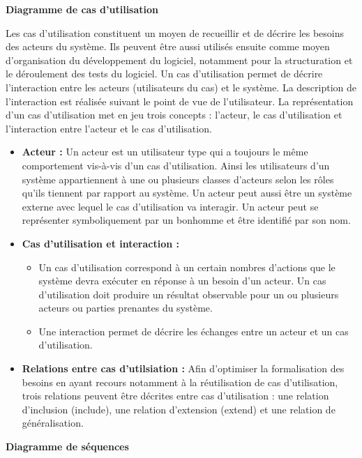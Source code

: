  \textbf{Diagramme de cas d'utilisation}

Les cas d’utilisation constituent un moyen de recueillir et de décrire les besoins des acteurs du système. Ils peuvent être aussi utilisés ensuite comme moyen d’organisation du développement du logiciel, notamment pour la structuration et le déroulement des tests du logiciel. Un cas d’utilisation permet de décrire l’interaction entre les acteurs (utilisateurs du cas) et le système. La description de l’interaction est réalisée suivant le point de vue de l’utilisateur. La représentation d’un cas d’utilisation met en jeu trois concepts : l’acteur, le cas d’utilisation et l’interaction entre l’acteur et le cas d’utilisation.

\begin{itemize}[label=\textbullet, font=\LARGE \color{blue}] 
	\item   \textbf{Acteur :} 
	Un acteur est un utilisateur type qui a toujours le même comportement vis-à-vis d’un cas d’utilisation. Ainsi les utilisateurs d’un système appartiennent à une ou plusieurs classes d’acteurs selon les rôles qu’ils tiennent par rapport au système. Un acteur peut aussi être un système externe avec lequel le cas d’utilisation va interagir. Un acteur peut se représenter symboliquement par un bonhomme et être identifié par son nom. 
	
	\item  \textbf{Cas d'utilisation et interaction :}
		\begin{itemize}[label=\textbullet, font=\LARGE \color{black}] 
			\item  Un cas d’utilisation correspond à un certain nombres d’actions que le système devra exécuter en réponse à un besoin d’un acteur. Un cas d’utilisation doit produire un résultat observable pour un ou plusieurs acteurs ou parties prenantes du système.
			\item  Une interaction permet de décrire les échanges entre un acteur et un cas d’utilisation.
		\end{itemize}
	\item  \textbf{Relations entre cas d'utilsiation :}
	Afin d’optimiser la formalisation des besoins en ayant recours notamment à la réutilisation de cas d’utilisation, trois relations peuvent être décrites entre cas d’utilisation : une relation d’inclusion (include), une relation d’extension (extend) et une relation de généralisation. 
\end{itemize}

\textbf{Diagramme de séquences}

